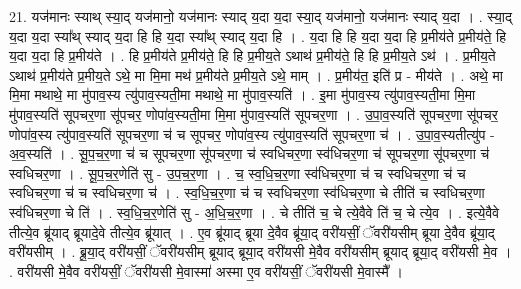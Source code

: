 \documentclass[17pt]{extarticle}
\begin{document}
21. यज॑मानः स्याथ् स्या॒द् यज॑मानो॒ यज॑मानः स्याद् य॒दा य॒दा स्या॒द् यज॑मानो॒ यज॑मानः स्याद् य॒दा । . स्या॒द् य॒दा य॒दा स्या᳚थ् स्याद् य॒दा हि हि य॒दा स्या᳚थ् स्याद् य॒दा हि । . य॒दा हि हि य॒दा य॒दा हि प्र॒मीय॑ते प्र॒मीय॑ते॒ हि य॒दा य॒दा हि प्र॒मीय॑ते । . हि प्र॒मीय॑ते प्र॒मीय॑ते॒ हि हि प्र॒मीय॒ते ऽथाथ॑ प्र॒मीय॑ते॒ हि हि प्र॒मीय॒ते ऽथ॑ । . प्र॒मीय॒ते ऽथाथ॑ प्र॒मीय॑ते प्र॒मीय॒ते ऽथे॒ मा मि॒मा मथ॑ प्र॒मीय॑ते प्र॒मीय॒ते ऽथे॒ माम् । . प्र॒मीय॑त॒ इति॑ प्र - मीय॑ते । . अथे॒ मा मि॒मा मथाथे॒ मा मु॑पाव॒स्य त्यु॑पाव॒स्यती॒मा मथाथे॒ मा मु॑पाव॒स्यति॑ । . इ॒मा मु॑पाव॒स्य त्यु॑पाव॒स्यती॒मा मि॒मा मु॑पाव॒स्यति॑ सूपचर॒णा सू॑पचर॒ णोपा॑व॒स्यती॒मा मि॒मा मु॑पाव॒स्यति॑ सूपचर॒णा । . उ॒पा॒व॒स्यति॑ सूपचर॒णा सू॑पचर॒ णोपा॑व॒स्य त्यु॑पाव॒स्यति॑ सूपचर॒णा च॑ च सूपचर॒ णोपा॑व॒स्य त्यु॑पाव॒स्यति॑ सूपचर॒णा च॑ । . उ॒पा॒व॒स्यतीत्यु॑प - अ॒व॒स्यति॑ । . सू॒प॒च॒र॒णा च॑ च सूपचर॒णा सू॑पचर॒णा च॑ स्वधिचर॒णा स्व॑धिचर॒णा च॑ सूपचर॒णा सू॑पचर॒णा च॑ स्वधिचर॒णा । . सू॒प॒च॒र॒णेति॑ सु - उ॒प॒च॒र॒णा । . च॒ स्व॒धि॒च॒र॒णा स्व॑धिचर॒णा च॑ च स्वधिचर॒णा च॑ च स्वधिचर॒णा च॑ च स्वधिचर॒णा च॑ । . स्व॒धि॒च॒र॒णा च॑ च स्वधिचर॒णा स्व॑धिचर॒णा चे तीति॑ च स्वधिचर॒णा स्व॑धिचर॒णा चे ति॑ । . स्व॒धि॒च॒र॒णेति॑ सु - अ॒धि॒च॒र॒णा । . चे तीति॑ च॒ चे त्ये॒वैवे ति॑ च॒ चे त्ये॒व । . इत्ये॒वैवे तीत्ये॒व ब्रू॑याद् ब्रूयादे॒वे तीत्ये॒व ब्रू॑यात् । . ए॒व ब्रू॑याद् ब्रूया दे॒वैव ब्रू॑या॒द् वरी॑यसीं॒ ॅवरी॑यसीम् ब्रूया दे॒वैव ब्रू॑या॒द् वरी॑यसीम् । . ब्रू॒या॒द् वरी॑यसीं॒ ॅवरी॑यसीम् ब्रूयाद् ब्रूया॒द् वरी॑यसी मे॒वैव वरी॑यसीम् ब्रूयाद् ब्रूया॒द् वरी॑यसी मे॒व । . वरी॑यसी मे॒वैव वरी॑यसीं॒ ॅवरी॑यसी मे॒वास्मा॑ अस्मा ए॒व वरी॑यसीं॒ ॅवरी॑यसी मे॒वास्मै᳚ । \newline
\end{document}
